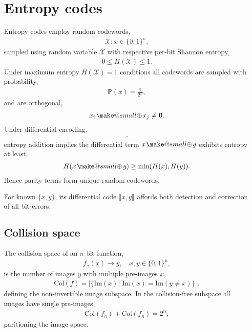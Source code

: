 \documentclass[twocolumn, aps, amsmath, amssymb, nofootinbib, superscriptaddress, longbibliography, doublefloatfix, table-of-contents, eqsecnum, rmp]{revtex4-2}
\makeatletter
\def\diff#1#2{\llbracket #1,#2\rrbracket}
\newcommand{\soplus}{{{\hspace{1pt}}{\mathbin{\mathpalette\make@small\oplus}}}{\hspace{1pt}}}
\newcommand{\make@small}[2]{%
  \vcenter{\hbox{%
    \scalebox{0.6}{$\m@th#1#2$}%
  }}%
}
\makeatother
\begin{document}
\section{Entropy codes}

Entropy codes employ random codewords,
\begin{align}
	\mathcal{X}: x \in \{0,1\}^n,
\end{align}
sampled using random variable $\mathcal{X}$ with respective per-bit Shannon entropy,
\begin{align}
	0\leq H(\mathcal{X})\leq 1.
\end{align}
Under maximum entropy $H(\mathcal{X})=1$ conditions all codewords are sampled with probability,
\begin{align}
	\mathbb{P}(x) = \frac{1}{2^n},	
\end{align}
and are orthogonal,
\begin{align}
	x_i \soplus x_j \neq \mathbf{0}.
\end{align}
Under differential encoding,
\begin{align}
	[x,x\soplus y],
\end{align}
entropy addition implies the differential term $x\soplus y$ exhibits entropy at least,
\begin{align}
	H(x\soplus y) \geq \min(H(x),H(y)).
\end{align}
Hence parity terms form unique random codewords.

For known $\{x,y\}$, its differential code $\diff{x}{y}$ affords both detection and correction of all bit-errors.

\subsection{Collision space}

The collision space of an $n$-bit function,
\begin{align}
	f_n(x) \to y,\quad x,y\in\{0,1\}^n,
\end{align}
is the number of images $y$ with multiple pre-images $x$,
\begin{align}
	\mathrm{Col}(f) = |\{\mathrm{Im}(x)\,|\,\mathrm{Im}(x)=\mathrm{Im}(y\neq x)\}|,
\end{align}
defining the non-invertible image subspace. In the collision-free subspace all images have single pre-images,
\begin{align}
	\overline{\mathrm{Col}}(f_n) + \mathrm{Col}(f_n) = 2^n,
\end{align}
paritioning the image space.
\end{document}
